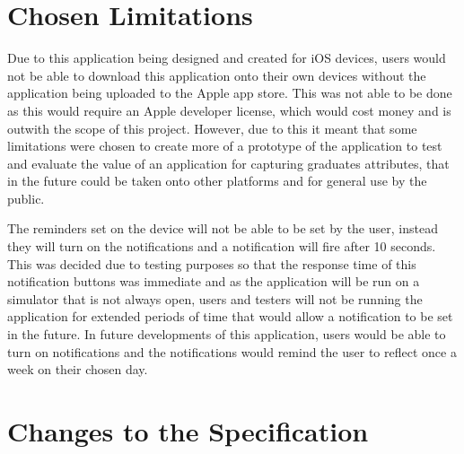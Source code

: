 \documentclass{l4proj}
\begin{document}
\section{Chosen Limitations}

Due to this application being designed and created for iOS devices, users would not be able to download this application onto their own 
devices without the application being uploaded to the Apple app store. This was not able to be done as this would require an Apple 
developer license, which would cost money and is outwith the scope of this project. However, due to this it meant that some limitations 
were chosen to create more of a prototype of the application to test and evaluate the value of an application for capturing graduates 
attributes, that in the future could be taken onto other platforms and for general use by the public.

The reminders set on the device will not be able to be set by the user, instead they will turn on the notifications
    and a notification will fire after 10 seconds. This was decided due to testing purposes so that the response time of this notification
    buttons was immediate and as the application will be run on a simulator that is not always open, users and testers will not be running
    the application for extended periods of time that would allow a notification to be set in the future. In future developments of this
    application, users would be able to turn on notifications and the notifications would remind the user to reflect once a week on their
    chosen day. 

\section{Changes to the Specification}
\end{document}

